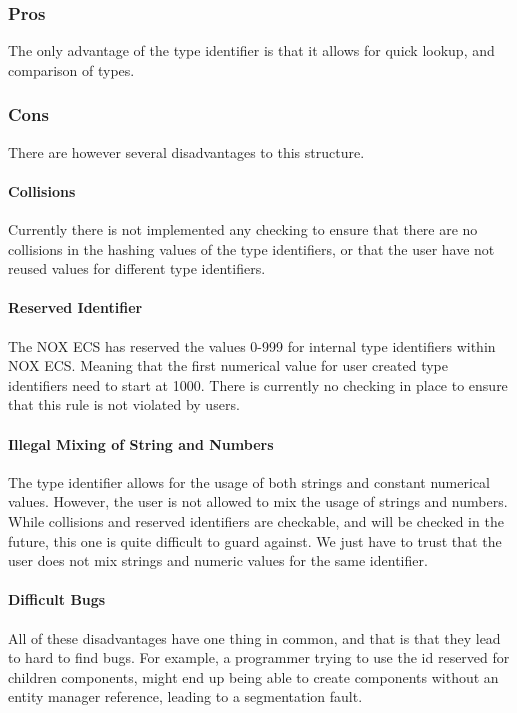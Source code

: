 \subsubsection{Pros}
The only advantage of the type identifier is that it allows for quick lookup,
and comparison of types.

\subsubsection{Cons}
There are however several disadvantages to this structure.

\paragraph{Collisions}
Currently there is not implemented any checking to ensure that there are no
collisions in the hashing values of the type identifiers, or that the user
have not reused values for different type identifiers.

\paragraph{Reserved Identifier}
The NOX ECS has reserved the values 0-999 for internal type identifiers within
NOX ECS. Meaning that the first numerical value for user created type identifiers
need to start at 1000. There is currently no checking
in place to ensure that this rule is not violated by users.

\paragraph{Illegal Mixing of String and Numbers}
The type identifier allows for the usage of both strings and constant numerical values.
However, the user is not allowed to mix the usage of strings and numbers.
While collisions and reserved identifiers are checkable, and will be checked in the future,
this one is quite difficult to guard against. We just have to trust that the user does not
mix strings and numeric values for the same identifier.

\paragraph{Difficult Bugs}
All of these disadvantages have one thing in common, and that is that they lead to
hard to find bugs. For example, a programmer trying to use the id reserved for
children components, might end up being able to create components without an entity manager
reference, leading to a segmentation fault.
